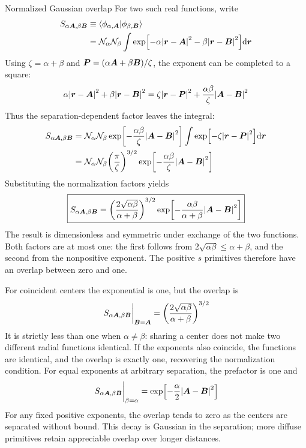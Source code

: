\begin{hfsolution}{Normalized Gaussian overlap}
For two such real functions, write
\begin{equation}
\begin{split}
  S_{\alpha\boldsymbol{A},\beta\boldsymbol{B}}
  &\equiv\braket{\phi_{\alpha,\boldsymbol{A}}}{\phi_{\beta,\boldsymbol{B}}}\\
  &=\mathcal{N}_\alpha\mathcal{N}_\beta
    \int\exp[-\alpha\abs{\boldsymbol{r}-\boldsymbol{A}}^2
             -\beta\abs{\boldsymbol{r}-\boldsymbol{B}}^2]\dd\boldsymbol{r}
\end{split}
\end{equation}
Using $\zeta=\alpha+\beta$ and
$\boldsymbol{P}=(\alpha\boldsymbol{A}+\beta\boldsymbol{B})/\zeta$, the exponent can be completed to a
square:
\begin{equation}
  \alpha\abs{\boldsymbol{r}-\boldsymbol{A}}^2+\beta\abs{\boldsymbol{r}-\boldsymbol{B}}^2
  =\zeta\abs{\boldsymbol{r}-\boldsymbol{P}}^2
   +\frac{\alpha\beta}{\zeta}\abs{\boldsymbol{A}-\boldsymbol{B}}^2
\end{equation}
Thus the separation-dependent factor leaves the integral:
\begin{equation}
\begin{split}
  S_{\alpha\boldsymbol{A},\beta\boldsymbol{B}}
  &=\mathcal{N}_\alpha\mathcal{N}_\beta
    \exp[-\frac{\alpha\beta}{\zeta}\abs{\boldsymbol{A}-\boldsymbol{B}}^2]
    \int\exp[-\zeta\abs{\boldsymbol{r}-\boldsymbol{P}}^2]\dd\boldsymbol{r}\\
  &=\mathcal{N}_\alpha\mathcal{N}_\beta
    \qty(\frac{\pi}{\zeta})^{3/2}
    \exp[-\frac{\alpha\beta}{\zeta}\abs{\boldsymbol{A}-\boldsymbol{B}}^2]
\end{split}
\end{equation}
Substituting the normalization factors yields
\begin{equation}
  \boxed{
  S_{\alpha\boldsymbol{A},\beta\boldsymbol{B}}
  =\qty(\frac{2\sqrt{\alpha\beta}}{\alpha+\beta})^{3/2}
    \exp[-\frac{\alpha\beta}{\alpha+\beta}\abs{\boldsymbol{A}-\boldsymbol{B}}^2]
  }
\end{equation}
The result is dimensionless and symmetric under exchange of the two
functions. Both factors are at most one: the first follows from
$2\sqrt{\alpha\beta}\leq\alpha+\beta$, and the second from the
nonpositive exponent. The positive $s$ primitives therefore have an
overlap between zero and one.

For coincident centers the exponential is one, but the overlap is
\begin{equation}
  \eval{S_{\alpha\bA,\beta\bB}}_{\bB=\bA}
  =\qty(\frac{2\sqrt{\alpha\beta}}{\alpha+\beta})^{3/2}
\end{equation}
It is strictly less than one when $\alpha\ne\beta$: sharing a center does
not make two different radial functions identical. If the exponents also
coincide, the functions are identical, and the overlap is exactly one,
recovering the normalization condition.
For equal exponents at arbitrary separation, the prefactor is one and
\begin{equation}
  \eval{S_{\alpha\bA,\beta\bB}}_{\beta=\alpha}
  =\exp[-\frac{\alpha}{2}\abs{\bA-\bB}^2]
\end{equation}
For any fixed positive exponents, the overlap tends to zero as the centers
are separated without bound. This decay is Gaussian in the separation;
more diffuse primitives retain appreciable overlap over longer distances.


\end{hfsolution}
